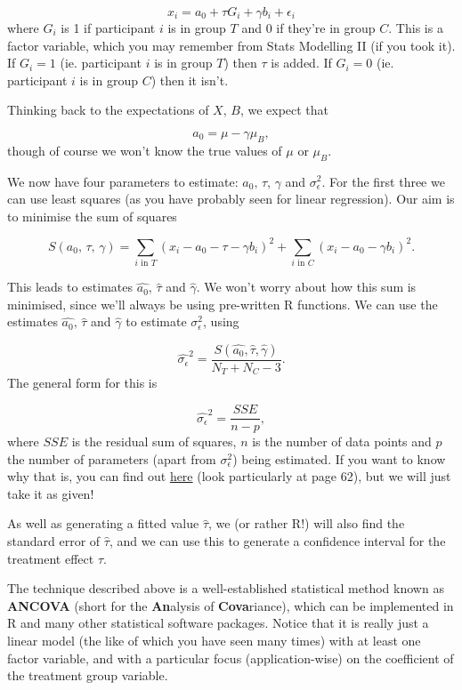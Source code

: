 \documentclass[
  openany]{book}
\theoremstyle{definition}
\theoremstyle{definition}
\theoremstyle{definition}
\theoremstyle{definition}
\theoremstyle{remark}
\begin{document}
\[ x_i = a_0 + \tau G_i+ \gamma b_i + \epsilon_i \]
where \(G_i\) is 1 if participant \(i\) is in group \(T\) and 0 if they're in group \(C\). This is a factor variable, which you may remember from Stats Modelling II (if you took it). If \(G_i=1\) (ie. participant \(i\) is in group \(T\)) then \(\tau\) is added. If \(G_i=0\) (ie. participant \(i\) is in group \(C\)) then it isn't.

Thinking back to the expectations of \(X,\,B\), we expect that

\[a_0 = \mu - \gamma\mu_B,\]
though of course we won't know the true values of \(\mu\) or \(\mu_B\).

We now have four parameters to estimate: \(a_0,\,\tau,\,\gamma\) and \(\sigma^2_\epsilon\). For the first three we can use least squares (as you have probably seen for linear regression). Our aim is to minimise the sum of squares

\[S\left(a_0,\, \tau,\,\gamma\right) = \sum\limits_{i\text{ in }T} \left(x_i - a_0 - \tau - \gamma b_i\right)^2 + \sum\limits_{i\text{ in }C} \left(x_i - a_0 - \gamma b_i\right)^2.\]

This leads to estimates \(\hat{a_0},\, \hat{\tau}\) and \(\hat{\gamma}\). We won't worry about how this sum is minimised, since we'll always be using pre-written R functions. We can use the estimates \(\hat{a_0},\, \hat{\tau}\) and \(\hat{\gamma}\) to estimate \(\sigma^2_\epsilon\), using

\[\hat{\sigma_\epsilon}^2 = \frac{S\left(\hat{a_0},\hat{\tau}, \hat{\gamma}\right)}{N_T + N_C -3}.\]
The general form for this is

\[ \hat{\sigma_\epsilon}^2 = \frac{SSE}{n-p},\]
where \(SSE\) is the residual sum of squares, \(n\) is the number of data points and \(p\) the number of parameters (apart from \(\sigma_\epsilon^2\)) being estimated. If you want to know why that is, you can find out \href{https://pages.stern.nyu.edu/~wgreene/MathStat/GreeneChapter4.pdf}{here} (look particularly at page 62), but we will just take it as given!

As well as generating a fitted value \(\hat{\tau}\), we (or rather R!) will also find the standard error of \(\hat\tau\), and we can use this to generate a confidence interval for the treatment effect \(\tau\).

The technique described above is a well-established statistical method known as \textbf{ANCOVA} (short for the \textbf{An}alysis of \textbf{Cova}riance), which can be implemented in R and many other statistical software packages. Notice that it is really just a linear model (the like of which you have seen many times) with at least one factor variable, and with a particular focus (application-wise) on the coefficient of the treatment group variable.
\end{document}
